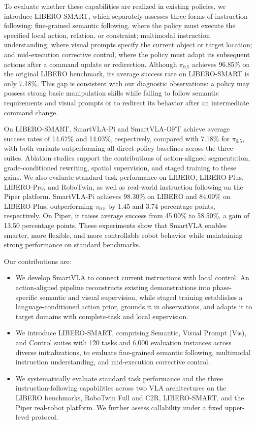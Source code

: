 To evaluate whether these capabilities are realized in existing policies, we introduce LIBERO-SMART,
which separately assesses three forms of instruction following: fine-grained semantic following,
where the policy must execute the specified local action, relation, or constraint; multimodal
instruction understanding, where visual prompts specify the current object or target location; and
mid-execution corrective control, where the policy must adapt its subsequent actions after a command
update or redirection.
Although $\pi_{0.5}$ achieves 96.85\% on the original LIBERO benchmark, its average success rate on
LIBERO-SMART is only 7.18\%. This gap is consistent with our diagnostic observations: a policy may
possess strong basic manipulation skills while failing to follow semantic requirements and visual
prompts or to redirect its behavior after an intermediate command change.

On LIBERO-SMART, SmartVLA-Pi and SmartVLA-OFT achieve average success rates of 14.67\% and 14.03\%,
respectively, compared with 7.18\% for $\pi_{0.5}$, with both variants outperforming all
direct-policy baselines across the three suites. Ablation studies support the contributions of
action-aligned segmentation, grade-conditioned rewriting, spatial supervision, and staged training
to these gains. We also evaluate standard task performance on
LIBERO, LIBERO-Plus, LIBERO-Pro, and RoboTwin, as well as real-world instruction following on the
Piper platform. SmartVLA-Pi achieves 98.30\% on LIBERO
and 84.00\% on LIBERO-Plus, outperforming $\pi_{0.5}$ by 1.45 and 3.74 percentage points,
respectively. On Piper, it raises average success from 45.00\% to 58.50\%, a gain of 13.50
percentage points. These experiments show that SmartVLA enables smarter, more flexible, and more
controllable robot behavior while maintaining strong performance on standard benchmarks.

Our contributions are:

\begin{itemize}
\item
  We develop SmartVLA to connect current instructions with local control. An action-aligned pipeline
  reconstructs existing demonstrations into phase-specific semantic and visual supervision, while
  staged training establishes a language-conditioned action prior, grounds it in observations, and
  adapts it to target domains with complete-task and local supervision.
\item
  We introduce LIBERO-SMART, comprising Semantic, Visual Prompt (Vis), and
  Control suites with 120 tasks and 6,000 evaluation instances across
  diverse initializations, to evaluate fine-grained semantic following,
  multimodal instruction understanding, and mid-execution corrective control.
\item
  We systematically evaluate standard task performance and the three
  instruction-following capabilities across two VLA architectures on
  the LIBERO benchmarks, RoboTwin Full and C2R, LIBERO-SMART, and the
  Piper real-robot platform. We further assess callability under a
  fixed upper-level protocol.
\end{itemize}

